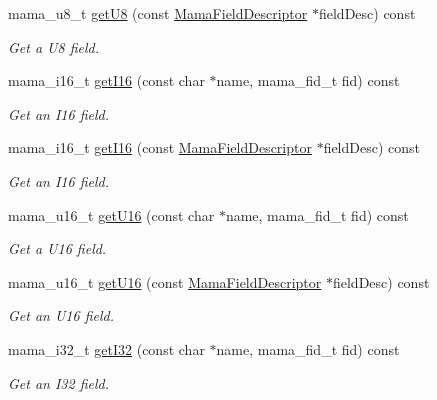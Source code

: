 \begin{DoxyCompactItemize}
mama\_\-u8\_\-t \hyperlink{classWombat_1_1MamaMsg_a0ea0b1f54c72c8db781bd4eb165c34dc}{getU8} (const \hyperlink{classWombat_1_1MamaFieldDescriptor}{MamaFieldDescriptor} $\ast$fieldDesc) const 
\begin{DoxyCompactList}\small\item\em Get a U8 field. \item\end{DoxyCompactList}\item 
mama\_\-i16\_\-t \hyperlink{classWombat_1_1MamaMsg_a4e00962efb3ccc875dc2842d9c0a36a8}{getI16} (const char $\ast$name, mama\_\-fid\_\-t fid) const 
\begin{DoxyCompactList}\small\item\em Get an I16 field. \item\end{DoxyCompactList}\item 
mama\_\-i16\_\-t \hyperlink{classWombat_1_1MamaMsg_ac1935ba284cd4aa19751e273cbb0aebd}{getI16} (const \hyperlink{classWombat_1_1MamaFieldDescriptor}{MamaFieldDescriptor} $\ast$fieldDesc) const 
\begin{DoxyCompactList}\small\item\em Get an I16 field. \item\end{DoxyCompactList}\item 
mama\_\-u16\_\-t \hyperlink{classWombat_1_1MamaMsg_a0f12dcdc736320aebb1d7fa11a31ee7d}{getU16} (const char $\ast$name, mama\_\-fid\_\-t fid) const 
\begin{DoxyCompactList}\small\item\em Get a U16 field. \item\end{DoxyCompactList}\item 
mama\_\-u16\_\-t \hyperlink{classWombat_1_1MamaMsg_a40b5ef85d72b3dd7f6bab0469a9df918}{getU16} (const \hyperlink{classWombat_1_1MamaFieldDescriptor}{MamaFieldDescriptor} $\ast$fieldDesc) const 
\begin{DoxyCompactList}\small\item\em Get an U16 field. \item\end{DoxyCompactList}\item 
mama\_\-i32\_\-t \hyperlink{classWombat_1_1MamaMsg_a67fbfdf37ade025708dfe67bf5e91d9e}{getI32} (const char $\ast$name, mama\_\-fid\_\-t fid) const 
\begin{DoxyCompactList}\small\item\em Get an I32 field. \item\end{DoxyCompactList}\item 

\end{DoxyCompactItemize}
